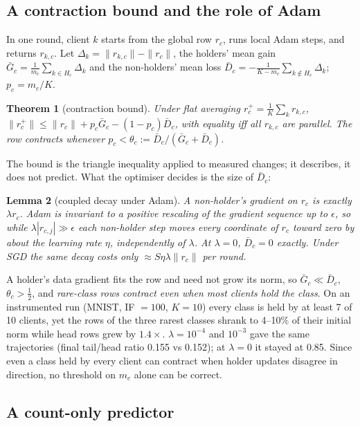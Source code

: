 \documentclass[10pt]{article}
\theoremstyle{plain}
\newtheorem{theorem}{Theorem}
\newtheorem{lemma}[theorem]{Lemma}
\theoremstyle{definition}
\begin{document}
\subsection{A contraction bound and the role of Adam}

In one round, client $k$ starts from the global row $r_c$, runs local Adam steps, and returns $r_{k,c}$. Let
$\Delta_k=\|r_{k,c}\|-\|r_c\|$, the holders' mean gain $\bar G_c=\frac1{m_c}\sum_{k\in H_c}\Delta_k$ and the
non-holders' mean loss $\bar D_c=-\frac1{K-m_c}\sum_{k\notin H_c}\Delta_k$; $p_c=m_c/K$.

\begin{theorem}[contraction bound]\label{thm:contraction}
Under flat averaging $r_c^+=\frac1K\sum_kr_{k,c}$,
\(\|r_c^+\|\le\|r_c\|+p_c\bar G_c-(1-p_c)\bar D_c\), with equality iff all $r_{k,c}$ are parallel. The row contracts
whenever $p_c<\theta_c:=\bar D_c/(\bar G_c+\bar D_c)$.
\end{theorem}

The bound is the triangle inequality applied to measured changes; it describes, it does not predict. What the optimiser
decides is the size of $\bar D_c$:

\begin{lemma}[coupled decay under Adam]\label{lem:adam}
A non-holder's gradient on $r_c$ is exactly $\lambda r_c$. Adam is invariant to a positive rescaling of the gradient
sequence up to $\epsilon$, so while $\lambda|r_{c,j}|\gg\epsilon$ each non-holder step moves every coordinate of $r_c$
toward zero by about the learning rate $\eta$, independently of $\lambda$. At $\lambda=0$, $\bar D_c=0$ exactly.
Under SGD the same decay costs only $\approx S\eta\lambda\|r_c\|$ per round.
\end{lemma}

A holder's data gradient fits the row and need not grow its norm, so $\bar G_c\ll\bar D_c$,
$\theta_c>\frac12$, and \emph{rare-class rows contract even when most clients hold the class}. On an instrumented run
(MNIST, IF $=100$, $K=10$) every class is held by at least 7 of 10 clients, yet the rows of the three rarest classes
shrank to 4--10\% of their initial norm while head rows grew by $1.4\times$. $\lambda=10^{-4}$ and $10^{-3}$ gave
the same trajectories (final tail/head ratio 0.155 vs 0.152); at $\lambda=0$ it stayed at 0.85. Since even a class held
by every client can contract when holder updates disagree in direction, no threshold on $m_c$ alone can be correct.

\subsection{A count-only predictor}
\end{document}
